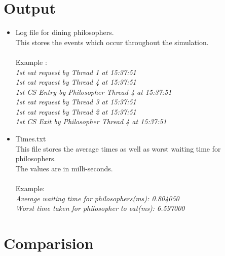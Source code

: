 \documentclass[12pt]{article}
\begin{document}
\section{Output}
\begin{itemize}
\item Log file for dining philosophers.\\
This stores the events which occur throughout the simulation.\\
\\Example : \\
\textit{1st eat request by Thread 1 at 15:37:51}\\
\textit{1st eat request by Thread 4 at 15:37:51}\\
\textit{1st CS Entry by Philosopher Thread 4 at 15:37:51}\\
\textit{1st eat request by Thread 3 at 15:37:51}\\
\textit{1st eat request by Thread 2 at 15:37:51}\\
\textit{1st CS Exit by Philosopher Thread 4 at 15:37:51}\\
\item Times.txt\\
This file stores the average times as well as worst waiting time for philosophers.\\
The values are in milli-seconds.\\
\\Example: \\
\textit{Average waiting time for philosophers(ms): 0.804050}\\
\textit{Worst time taken for philosopher to eat(ms): 6.597000}\\
\end{itemize}

\newpage

\section{Comparision}
\end{document}
